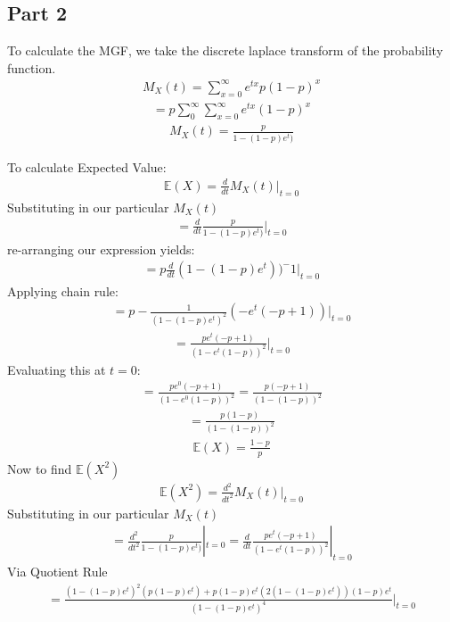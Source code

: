 \documentclass{article}
\begin{document}
\subsection*{Part 2}
To calculate the MGF, we take the discrete laplace transform of the probability function.
\begin{align*}
M_X(t) = \sum_{x=0}^{\infty} e^{t x} p(1-p)^x
\end{align*}
\begin{align*}
 = p \sum_{0}^{\infty} \sum_{x=0}^{\infty} e^{t x} (1-p)^x
\end{align*}
\begin{align*}
M_X(t) = \frac{p}{1-(1-p)e^t)}
\end{align*}

To calculate Expected Value:
\begin{align*}
\mathbb{E}(X)=\frac{d}{dt}M_X(t) |_{t=0}
\end{align*}
Substituting in our particular $M_X(t)$
\begin{align*}
=\frac{d}{dt}\frac{p}{1-(1-p)e^t)} |_{t=0}
\end{align*}
re-arranging our expression yields:
\begin{align*}
= p \frac{d}{dt} (1-(1-p)e^t))^-1 |_{t=0}
\end{align*}
Applying chain rule:
\begin{align*}
= p -\frac{1}{(1-(1-p)e^t)^2} (-e^t(-p+1))  |_{t=0}
\end{align*}
\begin{align*}
=\frac{p e^t (-p+1)}{(1-e^t(1-p))^2}  |_{t=0}
\end{align*}
Evaluating this at $t=0$:
\begin{align*}
=\frac{p e^0 (-p+1)}{(1-e^0(1-p))^2} = \frac{p(-p+1)}{(1-(1-p))^2}
\end{align*}
\begin{align*}
=\frac{p(1-p)}{(1-(1-p))^2}
\end{align*}
\begin{align*}
\mathbb{E}(X)=\frac{1-p}{p}
\end{align*}
Now to find $\mathbb{E}(X^2)$
\begin{align*}
\mathbb{E}(X^2)=\frac{d^2}{dt^2}M_X(t) |_{t=0}
\end{align*}
Substituting in our particular $M_X(t)$
\begin{align*}
=\frac{d^2}{dt^2}\frac{p}{1-(1-p)e^t)} |_{t=0} = \frac{d}{dt} \frac{p e^t (-p+1)}{(1-e^t(1-p))^2} |_{t=0}
\end{align*}
Via Quotient Rule
\begin{align*}
=\frac{(1-(1-p)e^t)^2(p(1-p)e^t)+p(1-p)e^t(2(1-(1-p)e^t))(1-p)e^t}{(1-(1-p)e^t)^4} |_{t=0}
\end{align*}
\end{document}
